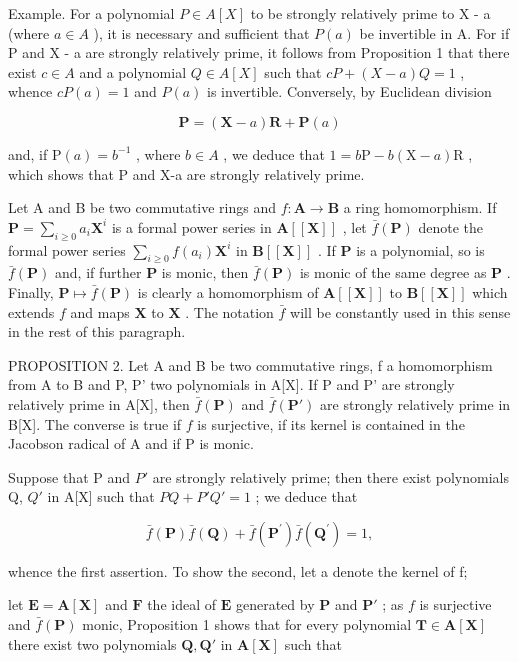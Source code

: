 Example. For a polynomial \(P \in A[X]\) to be strongly relatively prime to X - a (where \(a \in A\) ), it is necessary and sufficient that \(P(a)\) be invertible in A. For if P and X - a are strongly relatively prime, it follows from Proposition 1 that there exist \(c \in A\) and a polynomial \(Q \in A[X]\) such that \(cP + (X - a)Q = 1\) , whence \(cP(a) = 1\) and \(P(a)\) is invertible. Conversely, by Euclidean division

\[
\mathbf {P} = (\mathbf {X} - a) \mathbf {R} + \mathbf {P} (a)
\]

and, if \(\mathrm{P}(a)=b^{-1}\) , where \(b\in A\) , we deduce that \(1=b\mathrm{P}-b(\mathrm{X}-a)\mathrm{R}\) , which shows that P and X-a are strongly relatively prime.

Let A and B be two commutative rings and \(f\colon\mathbf{A}\to\mathbf{B}\) a ring homomorphism. If \(\mathbf{P}=\sum_{i\geqslant0}a_{i}\mathbf{X}^{i}\) is a formal power series in \(\mathbf{A}[[\mathbf{X}]]\) , let \(\bar{f}(\mathbf{P})\) denote the formal power series \(\sum_{i\geqslant0}f(a_{i})\mathbf{X}^{i}\) in \(\mathbf{B}[[\mathbf{X}]]\) . If \(\mathbf{P}\) is a polynomial, so is \(\bar{f}(\mathbf{P})\) and, if further \(\mathbf{P}\) is monic, then \(\bar{f}(\mathbf{P})\) is monic of the same degree as \(\mathbf{P}\) . Finally, \(\mathbf{P}\mapsto\bar{f}(\mathbf{P})\) is clearly a homomorphism of \(\mathbf{A}[[\mathbf{X}]]\) to \(\mathbf{B}[[\mathbf{X}]]\) which extends \(f\) and maps \(\mathbf{X}\) to \(\mathbf{X}\) . The notation \(\bar{f}\) will be constantly used in this sense in the rest of this paragraph.

PROPOSITION 2. Let A and B be two commutative rings, f a homomorphism from A to B and P, P' two polynomials in A{[}X{]}. If P and P' are strongly relatively prime in A{[}X{]}, then \(\bar{f}(\mathbf{P})\) and \(\bar{f}(\mathbf{P}')\) are strongly relatively prime in B{[}X{]}. The converse is true if \(f\) is surjective, if its kernel is contained in the Jacobson radical of A and if P is monic.

Suppose that P and \(P'\) are strongly relatively prime; then there exist polynomials Q, \(Q'\) in A{[}X{]} such that \(PQ + P'Q' = 1\) ; we deduce that

\[
\bar {f} (\mathbf {P}) \bar {f} (\mathbf {Q}) + \bar {f} (\mathbf {P} ^ {\prime}) \bar {f} (\mathbf {Q} ^ {\prime}) = 1,
\]

whence the first assertion. To show the second, let a denote the kernel of f;

let \(\mathbf{E} = \mathbf{A}[\mathbf{X}]\) and \(\mathbf{F}\) the ideal of \(\mathbf{E}\) generated by \(\mathbf{P}\) and \(\mathbf{P}'\) ; as \(f\) is surjective and \(\bar{f}(\mathbf{P})\) monic, Proposition 1 shows that for every polynomial \(\mathbf{T} \in \mathbf{A}[\mathbf{X}]\) there exist two polynomials \(\mathbf{Q}, \mathbf{Q}'\) in \(\mathbf{A}[\mathbf{X}]\) such that


